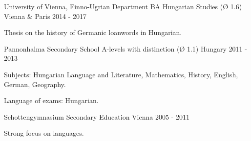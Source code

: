 \begin{cventries}
  \cventry
    {University of Vienna, Finno-Ugrian Department} %
    {BA Hungarian Studies (Ø 1.6)} %
    {Vienna \& Paris} %
    {2014 - 2017} %
    {
      \begin{cvitems} %
        \item {Thesis on the history of Germanic loanwords in Hungarian.}
      \end{cvitems}
    }
        
  \cventry
    {Pannonhalma Secondary School} %
    {A-levels with distinction (Ø 1.1)} %
    {Hungary} %
    {2011 - 2013} %
    {
      \begin{cvitems} %
        \item {Subjects: Hungarian Language and Literature, Mathematics, History, English, German, Geography.}
        \item{Language of exams: Hungarian.}
      \end{cvitems}
    }

  \cventry    
    {Schottengymnasium} %
    {Secondary Education} %
    {Vienna} %
    {2005 - 2011} %
    {
      \begin{cvitems} %
        \item {Strong focus on languages.}
      \end{cvitems}
    }
\end{cventries}
